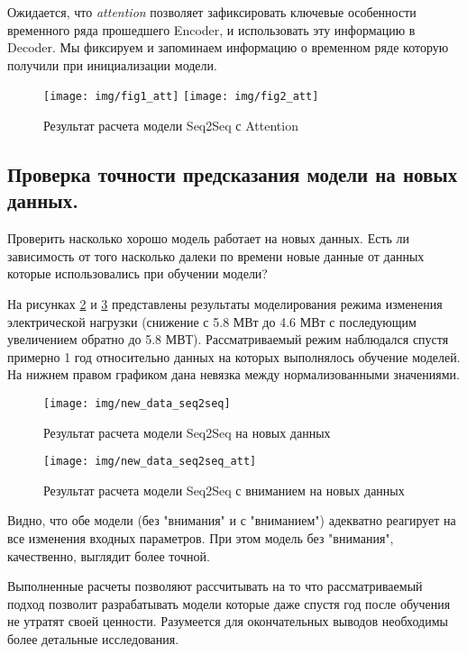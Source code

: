\documentclass[12pt,a4paper]{article}
\begin{document}
Ожидается, что {\it attention} позволяет зафиксировать ключевые особенности временного ряда прошедшего Encoder, и использовать эту информацию в Decoder. Мы фиксируем и запоминаем информацию о временном ряде которую получили при инициализации модели.


\begin{figure}[htb]
	\centering\texttt{[image: img/fig1\_att]}
	\centering\texttt{[image: img/fig2\_att]}
	\caption{Результат расчета модели Seq2Seq с Attention}
	\label{fig:res_att}
\end{figure}

\subsection{Проверка точности предсказания модели на новых данных.}

Проверить насколько хорошо модель работает на новых данных. Есть ли зависимость от того насколько далеки по времени новые данные от данных которые использовались при обучении модели?

На рисунках \ref{fig:new_data_seq2seq} и \ref{fig:new_data_seq2seq_att} представлены результаты моделирования режима изменения электрической нагрузки (снижение с 5.8 МВт до 4.6 МВт с последующим увеличением обратно до 5.8 МВТ). Рассматриваемый режим наблюдался спустя примерно 1 год относительно данных на которых выполнялось обучение моделей. На нижнем правом графиком дана невязка между нормализованными значениями.

\begin{figure}[htbp]
	\centering\texttt{[image: img/new\_data\_seq2seq]}
	\caption{Результат расчета модели Seq2Seq на новых данных}
	\label{fig:new_data_seq2seq}
\end{figure}

\begin{figure}[htbp]
	\centering\texttt{[image: img/new\_data\_seq2seq\_att]}
	\caption{Результат расчета модели Seq2Seq с вниманием на новых данных}
	\label{fig:new_data_seq2seq_att}
\end{figure}

Видно, что обе модели (без "внимания" и с "вниманием") адекватно реагирует на все изменения входных параметров. При этом модель без "внимания", качественно, выглядит более точной. 

Выполненные расчеты позволяют рассчитывать на то что рассматриваемый подход позволит разрабатывать модели которые даже спустя год после обучения не утратят своей ценности. Разумеется для окончательных выводов необходимы более детальные исследования.
\end{document}
